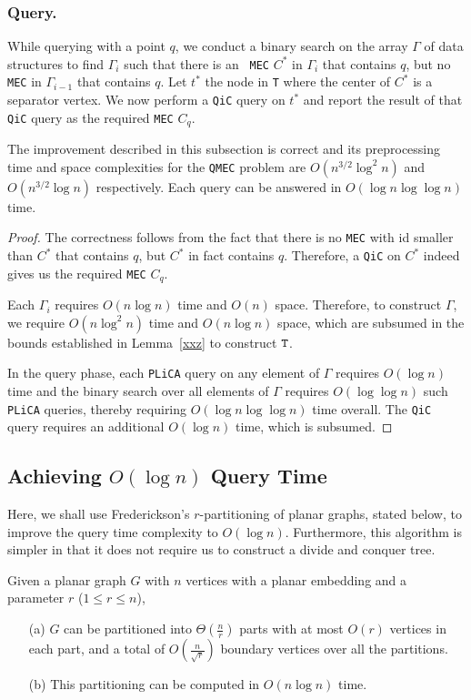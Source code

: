 \documentclass[12pt]{llncs}
\begin{document}
\subsubsection{Query.}
While querying with a point $q$, we conduct a binary search on the array $\Gamma$ 
of 
data structures to find $\Gamma_i$ such that there is an {\tt 
MEC} $C^*$ in $\Gamma_i$ that contains $q$, but no {\tt MEC} in $\Gamma_{i-1}$ 
that 
contains $q$. Let $t^*$ the node in {\tt T} where  the center of $C^*$ is a separator vertex. We now perform a {\tt QiC} query on $t^*$ and 
report the result of that {\tt QiC} query as the required {\tt MEC} $C_q$.
\begin{theorem}
The improvement described in this subsection is correct and its preprocessing time 
and 
space complexities for the {\tt QMEC} problem are  
$O(n^{3/2} \log^2 n)$ and  $O(n^{3/2} \log n)$ 
respectively. Each query can be answered in $O(\log n\log\log n)$ time.
\end{theorem}
\begin{proof}
The correctness follows from the fact that there is no {\tt MEC} with id smaller than 
$C^*$ 
that contains $q$, but $C^*$ in fact contains $q$. Therefore, 
a {\tt QiC} on $C^*$ indeed gives us the required {\tt MEC} $C_q$.

Each $\Gamma_i$ requires $O(n \log n)$ time and $O(n)$ space. Therefore, to 
construct 
$\Gamma$, we require $O(n \log^2 n)$ time and $O(n \log n)
$ space, which are subsumed in the bounds established in Lemma~\ref{xxz} to 
construct $
\tt T$.

In the query phase, each {\tt PLiCA} query on any element of $\Gamma$ requires 
$O(\log 
n)$ time and the binary search over all elements of $
\Gamma$ requires $O(\log \log n)$ such {\tt PLiCA} queries, thereby requiring $O(\log 
n 
\log \log n)$ time overall. The {\tt QiC} query requires an 
additional $O(\log n)$ time, which is subsumed. 
\end{proof}


\subsection{Achieving $O(\log n)$ Query Time}\label{sec:fastquery}
Here, we shall use Frederickson's $r$-partitioning of planar graphs, stated below, 
to improve the query time complexity to $O(\log n)$. Furthermore, this algorithm is 
simpler in that it does not require us to construct a divide and conquer tree. 


\begin{lemma} \label{fedrick}\cite{fed} Given a planar graph $G$ with $n$ vertices 
with a planar embedding and a parameter $r$ ($1 \leq r \leq n$),
\begin{itemize}
\item[(a)]  $G$ can be partitioned into $\Theta(\frac{n}{r})$  parts with at most $O(r)$ 
vertices in each part, and a total of $O(\frac{n}{\sqrt{r}})$ boundary vertices over 
all the 
partitions. 
\item[(b)] This partitioning can be computed in $O(n\log n)$ time. 
\end{itemize}
\end{lemma}
\end{document}
